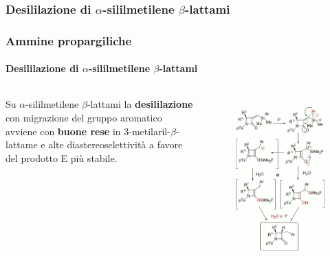\subsubsection{Desililazione di $\alpha$-sililmetilene $\beta$-lattami}\begin{frame}\frametitle{Ammine propargiliche}\framesubtitle{Desililazione di $\alpha$-sililmetilene $\beta$-lattami}
\begin{columns}
Su $\alpha$-sililmetilene $\beta$-lattami la {\bf desililazione} con migrazione del gruppo aromatico avviene con {\bf buone rese} in 3-metilaril-$\beta$-lattame e alte diastereoselettività a favore del prodotto E più stabile.

\vskip -13pt
\begin{figure}{\includegraphics[width=1\textwidth]{img/substrati/ammine-cicl-desilil.png}}\end{figure}
\end{columns}
 
\end{frame}

